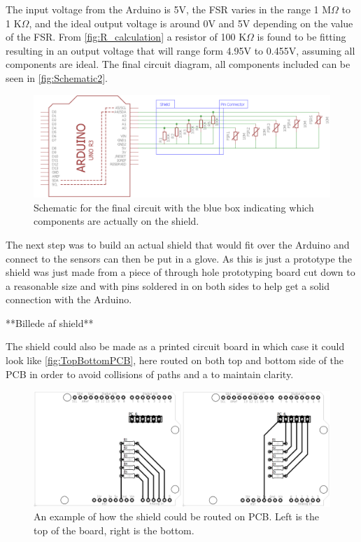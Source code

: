 The input voltage from the Arduino is 5V, the FSR varies in the range 1 M$\Omega$ to 1 K$\Omega$, and the ideal output voltage is around 0V and 5V depending on the value of the FSR. From \autoref{fig:R_calculation} a resistor of 100 K$\Omega$ is found to be fitting resulting in an output voltage that will range form 4.95V to 0.455V, assuming all components are ideal. The final circuit diagram, all components included can be seen in \autoref{fig:Schematic2}. 
\begin{figure}[H]
\centering
\includegraphics[scale=0.5]{Figure/Schematic2.png}
\caption{Schematic for the final circuit with the blue box indicating which components are actually on the shield.}
\label{fig:Schematic2}
\end{figure}

The next step was to build an actual shield that would fit over the Arduino and connect to the sensors can then be put in a glove. As this is just a prototype the shield was just made from a piece of through hole prototyping board cut down to a reasonable size and with pins soldered in on both sides to help get a solid connection with the Arduino.

**Billede af shield**

The shield could also be made as a printed circuit board in which case it could look like \autoref{fig:TopBottomPCB}, here routed on both top and bottom side of the PCB in order to avoid collisions of paths and a to maintain clarity.
\begin{figure}[H]
\centering
\includegraphics[scale=0.15]{Figure/TopBottomPCB.png}
\caption{An example of how the shield could be routed on PCB. Left is the top of the board, right is the bottom.}
\label{fig:TopBottomPCB}
\end{figure}